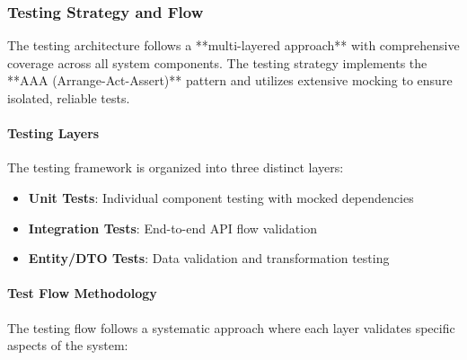 \subsubsection{Testing Strategy and Flow}
\label{subsubsec:testing_strategy}

The testing architecture follows a **multi-layered approach** with comprehensive coverage across all system components. The testing strategy implements the **AAA (Arrange-Act-Assert)** pattern and utilizes extensive mocking to ensure isolated, reliable tests.

\paragraph{Testing Layers}
The testing framework is organized into three distinct layers:

\begin{itemize}
    \item \textbf{Unit Tests}: Individual component testing with mocked dependencies
    \item \textbf{Integration Tests}: End-to-end API flow validation
    \item \textbf{Entity/DTO Tests}: Data validation and transformation testing
\end{itemize}

\paragraph{Test Flow Methodology}
The testing flow follows a systematic approach where each layer validates specific aspects of the system:

